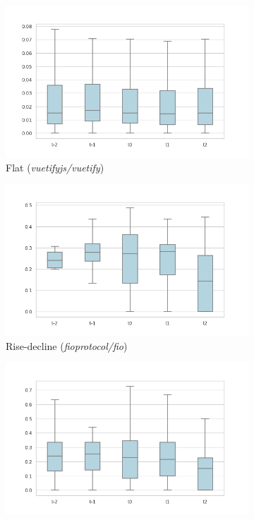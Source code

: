 \begin{figure}
    \centering
    \begin{subfigure}{0.49\textwidth}
        \centering
        \includegraphics[width=\textwidth]{figures/quantitative/boxplots/vuetifyjs_vuetify_flat.png}
        \caption{Flat (\textit{vuetifyjs/vuetify})}
        \label{fig:mean-path-pattern1}
    \end{subfigure}
    \begin{subfigure}{0.49\textwidth}
        \centering
        \includegraphics[width=\textwidth]{figures/quantitative/boxplots/fioprotocol_fio_rise-decline.png}
        \caption{Rise-decline (\textit{fioprotocol/fio})}
        \label{fig:mean-path-pattern2}
    \end{subfigure}
    \begin{subfigure}{0.49\textwidth}
        \centering
        \includegraphics[width=\textwidth]{figures/quantitative/boxplots/Flowminder_FlowKit_flat-decline.png}

\end{subfigure}
\end{figure}
